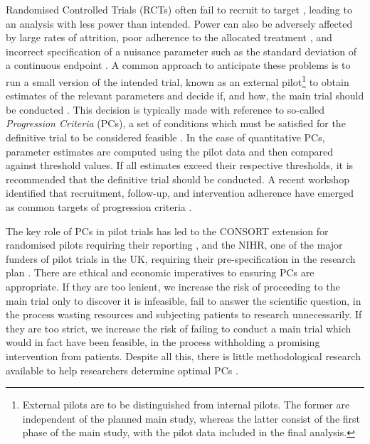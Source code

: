 \documentclass[AMA,STIX1COL]{WileyNJD-v2}
\begin{document}
Randomised Controlled Trials (RCTs) often fail to recruit to target \cite{Sully2013}, leading to an analysis with less power than intended. Power can also be adversely affected by large rates of attrition, poor adherence to the allocated treatment \cite{Fay2006}, and incorrect specification of a nuisance parameter such as the standard deviation of a continuous endpoint \cite{Teare2014}. A common approach to anticipate these problems is to run a small version of the intended trial, known as an external pilot\footnote{External pilots are to be distinguished from internal pilots. The former are independent of the planned main study, whereas the latter consist of the first phase of the main study, with the pilot data included in the final analysis.} to obtain estimates of the relevant parameters and decide if, and how, the main trial should be conducted  \cite{Craig2008, Eldridge2016}. This decision is typically made with reference to so-called \emph{Progression Criteria} (PCs), a set of conditions which must be satisfied for the definitive trial to be considered feasible \cite{Avery2017}. In the case of quantitative PCs, parameter estimates are computed using the pilot data and then compared against threshold values. If all estimates exceed their respective thresholds, it is recommended that the definitive trial should be conducted. A recent workshop identified that recruitment, follow-up, and intervention adherence have emerged as common targets of progression criteria \cite{Avery2017}. 

The key role of PCs in pilot trials has led to the CONSORT extension for randomised pilots requiring their reporting \cite{Eldridge2016a}, and the NIHR, one of the major funders of pilot trials in the UK, requiring their pre-specification in the research plan \cite{NIHR2017}. There are ethical and economic imperatives to ensuring PCs are appropriate. If they are too lenient, we increase the risk of proceeding to the main trial only to discover it is infeasible, fail to answer the scientific question, in the process wasting resources and subjecting patients to research unnecessarily. If they are too strict, we increase the risk of failing to conduct a main trial which would in fact have been feasible, in the process withholding a promising intervention from patients. Despite all this, there is little methodological research available to help researchers determine optimal PCs \cite{Avery2017}. 

\end{document}
